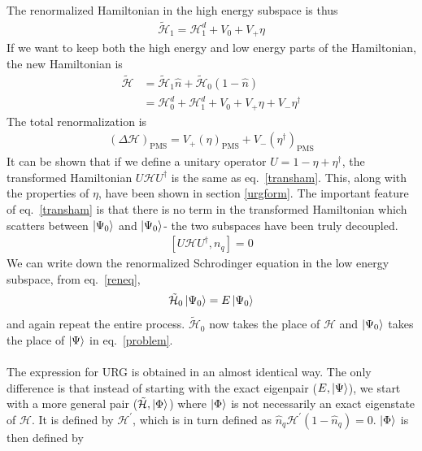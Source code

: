 \documentclass[twoside]{report}
\numberwithin{equation}{section}
\begin{document}
The renormalized Hamiltonian in the high energy subspace is thus
\begin{equation}\begin{aligned}
	\tilde{\mathcal{H}}_1 = \mathcal{H}^d_1 + V_0 + V_+ \eta
\end{aligned}\end{equation}
If we want to keep both the high energy and low energy parts of the Hamiltonian, the new Hamiltonian is
\begin{equation}\begin{aligned}
	\label{transham}
	\tilde{\mathcal{H}} &= \tilde{\mathcal{H}}_1 \hat n + \tilde{\mathcal{H}}_0 \left(1 - \hat n\right)\\
&= \mathcal{H}^d_0 + \mathcal{H}^d_1 + V_0 + V_+ \eta + V_- \eta^\dagger
\end{aligned}\end{equation}
The total renormalization is
\begin{equation}\begin{aligned}
	\left(\Delta \mathcal{H}\right)_\text{PMS} = V_+ \left(\eta\right)_\text{PMS} + V_- \left(\eta^\dagger\right)_\text{PMS}
\end{aligned}\end{equation}
It can be shown that if we define a unitary operator \(U = 1 - \eta + \eta^\dagger\), the transformed Hamiltonian \(U \mathcal{H} U^\dagger\) is the same as eq.~\ref{transham}. This, along with the properties of \(\eta\), have been shown in section \ref{urgform}. The important feature of eq.~\ref{transham} is that there is no term in the transformed Hamiltonian which scatters between \(\ket{\Psi_0}\) and \(\ket{\Psi_0}\)- the two subspaces have been truly decoupled.
\begin{equation}\begin{aligned}
	\left[U \mathcal{H} U^\dagger, n_q\right] = 0
\end{aligned}\end{equation}
We can write down the renormalized Schrodinger equation in the low energy subspace, from eq.~\ref{reneq},
\begin{equation}\begin{aligned}
	\tilde{\mathcal{H}}_0 \ket{\Psi_0} = E\ket{\Psi_0}
\end{aligned}\end{equation}
and again repeat the entire process. \(\tilde{\mathcal{H}}_0\) now takes the place of \(\mathcal{H}\) and \(\ket{\Psi_0}\) takes the place of \(\ket{\Psi}\) in eq.~\ref{problem}.
\\\\The expression for URG is obtained in an almost identical way. The only difference is that instead of starting with the exact eigenpair (\(E,\ket{\Psi}\)), we start with a more general pair (\(\tilde{\mathcal{H}}, \ket{\Phi}\)) where \(\ket{\Phi}\) is not necessarily an exact eigenstate of \(\mathcal{H}\). It is defined by \(\mathcal{H}^\prime\), which is in turn defined as \(\hat n_q \mathcal{H}^\prime\left(1 - \hat n_q\right) = 0\). \(\ket{\Phi}\) is then defined by
\end{document}
